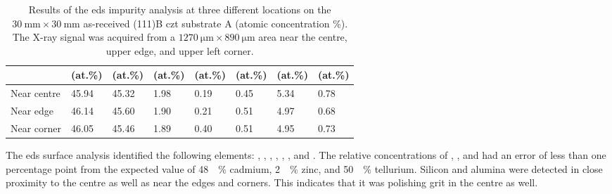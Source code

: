 \begin{table}[htbp]
    \centering
    \caption[\Ac{eds} impurity analysis of the as-received substrate A.]{Results of the \ac{eds} impurity analysis at three different locations on the $\SI{30}{\milli\metre}\times\SI{30}{\milli\metre}$ as-received (111)B \ac{czt} substrate A (atomic concentration \%). The X-ray signal was acquired from a $\SI{1270}{\micro\metre}\times\SI{890}{\micro\metre}$ area near the centre, upper edge, and upper left corner.}\label{tab:subAa_eds_analysis}
    \begin{tabu} to 1.0\textwidth { X[1.85,r] X[1.125,c] X[1.125,c] X[1.125,c] X[1.125,c] X[1.125,c] X[1.125,c] X[1.125,c] }
    \hline
         & \textbf{} (at.\%) & \textbf{} (at.\%) & \textbf{} (at.\%) & \textbf{ } (at.\%) & \textbf{} (at.\%) & \textbf{} (at.\%) & \textbf{} (at.\%) \\ %
        \hline
        Near centre  & \SI{45.94}{} & \SI{45.32}{} & \SI{1.98}{} & \SI{0.19}{} & \SI{0.45}{} & \SI{5.34}{} & \SI{0.78}{} \\ %
        Near edge & \SI{46.14}{} & \SI{45.60}{} & \SI{1.90}{} & \SI{0.21}{} & \SI{0.51}{} & \SI{4.97}{} & \SI{0.68}{} \\ %
        Near corner & \SI{46.05}{} & \SI{45.46}{} & \SI{1.89}{} & \SI{0.40}{} & \SI{0.51}{} & \SI{4.95}{} & \SI{0.73}{} \\ %
         \hline
    \end{tabu}
\end{table}

The \ac{eds} surface analysis identified the following elements: , , , , , , and . The relative concentrations of , , and  had an error of less than one percentage point from the expected value of \SI{48}{\atomic\percent} cadmium, \SI{2}{\atomic\percent} zinc, and \SI{50}{\atomic\percent} tellurium. Silicon and alumina were detected in close proximity to the centre as well as near the edges and corners. This indicates that it was polishing grit in the centre as well. %
